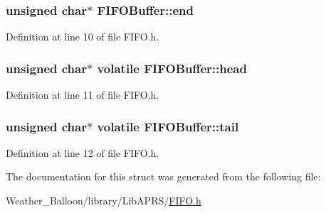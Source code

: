 \subsubsection[{\texorpdfstring{end}{end}}]{\setlength{\rightskip}{0pt plus 5cm}unsigned char$\ast$ F\+I\+F\+O\+Buffer\+::end}\hypertarget{struct_f_i_f_o_buffer_a1e404b7d86d0e1c46008cf0f71981b37}{}\label{struct_f_i_f_o_buffer_a1e404b7d86d0e1c46008cf0f71981b37}


Definition at line 10 of file F\+I\+F\+O.\+h.

\subsubsection[{\texorpdfstring{head}{head}}]{\setlength{\rightskip}{0pt plus 5cm}unsigned char$\ast$ volatile F\+I\+F\+O\+Buffer\+::head}\hypertarget{struct_f_i_f_o_buffer_a5c28bb45789016ae0dcf355453ebf116}{}\label{struct_f_i_f_o_buffer_a5c28bb45789016ae0dcf355453ebf116}


Definition at line 11 of file F\+I\+F\+O.\+h.

\subsubsection[{\texorpdfstring{tail}{tail}}]{\setlength{\rightskip}{0pt plus 5cm}unsigned char$\ast$ volatile F\+I\+F\+O\+Buffer\+::tail}\hypertarget{struct_f_i_f_o_buffer_a47d3fe1e057e44a108ea92b59b67e71a}{}\label{struct_f_i_f_o_buffer_a47d3fe1e057e44a108ea92b59b67e71a}


Definition at line 12 of file F\+I\+F\+O.\+h.



The documentation for this struct was generated from the following file\+:\begin{DoxyCompactItemize}
\item 
Weather\+\_\+\+Balloon/library/\+Lib\+A\+P\+R\+S/\hyperlink{_f_i_f_o_8h}{F\+I\+F\+O.\+h}\end{DoxyCompactItemize}
